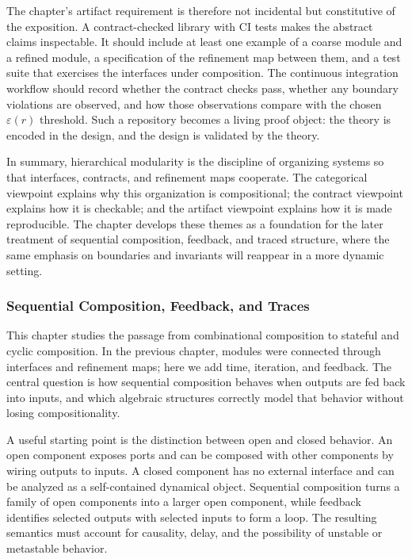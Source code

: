 \documentclass[11pt]{article}
\begin{document}
The chapter’s artifact requirement is therefore not incidental but constitutive of the exposition. A contract-checked library with CI tests makes the abstract claims inspectable. It should include at least one example of a coarse module and a refined module, a specification of the refinement map between them, and a test suite that exercises the interfaces under composition. The continuous integration workflow should record whether the contract checks pass, whether any boundary violations are observed, and how those observations compare with the chosen \(\varepsilon(r)\) threshold. Such a repository becomes a living proof object: the theory is encoded in the design, and the design is validated by the theory.

In summary, hierarchical modularity is the discipline of organizing systems so that interfaces, contracts, and refinement maps cooperate. The categorical viewpoint explains why this organization is compositional; the contract viewpoint explains how it is checkable; and the artifact viewpoint explains how it is made reproducible. The chapter develops these themes as a foundation for the later treatment of sequential composition, feedback, and traced structure, where the same emphasis on boundaries and invariants will reappear in a more dynamic setting.


\subsubsection{Sequential Composition, Feedback, and Traces}

This chapter studies the passage from combinational composition to stateful and cyclic composition. In the previous chapter, modules were connected through interfaces and refinement maps; here we add time, iteration, and feedback. The central question is how sequential composition behaves when outputs are fed back into inputs, and which algebraic structures correctly model that behavior without losing compositionality.

A useful starting point is the distinction between open and closed behavior. An open component exposes ports and can be composed with other components by wiring outputs to inputs. A closed component has no external interface and can be analyzed as a self-contained dynamical object. Sequential composition turns a family of open components into a larger open component, while feedback identifies selected outputs with selected inputs to form a loop. The resulting semantics must account for causality, delay, and the possibility of unstable or metastable behavior.
\end{document}
